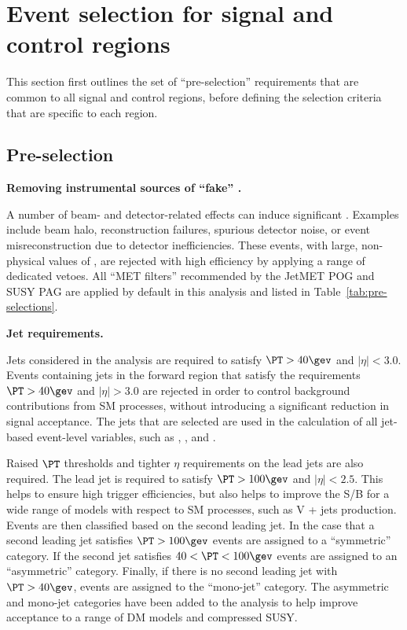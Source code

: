 \section{Event selection for signal and control regions}
\label{sec:selection}

This section first outlines the set of ``pre-selection'' requirements
that are common to all signal and control regions, before defining the
selection criteria that are specific to each region.

\subsection{Pre-selection}
\label{sec:preSelection}

{\bf Removing instrumental sources of ``fake'' \met.} 

A number of beam- and detector-related effects can induce significant
\met. Examples include beam halo, reconstruction failures, spurious
detector noise, or event misreconstruction due to detector
inefficiencies. These events, with large, non-physical values of \met,
are rejected with high efficiency by applying a range of dedicated
vetoes. All ``MET filters'' recommended by the JetMET POG and SUSY PAG
are applied by default in this analysis and listed in Table~\ref{tab:pre-selections}.

{\bf Jet requirements.} 

Jets considered in the analysis are required to satisfy $\PT>40\gev$
and $|\eta|<3.0$. Events containing jets in the forward region that
satisfy the requirements $\PT>40\gev$ and $|\eta|>3.0$ are rejected in
order to control background contributions from SM processes, without
introducing a significant reduction in signal acceptance. The jets
that are selected are used in the calculation of all jet-based
event-level variables, such as \HT, \mht, and \alphat.

Raised $\PT$ thresholds and tighter $\eta$ requirements on the lead jets 
are also required. The lead jet is required to satisfy $\PT > 100\gev$
and $|\eta|<2.5$. This helps to ensure high trigger efficiencies,
but also helps to improve the S/B for a wide
range of models with respect to SM processes, such as V + jets
production. Events are then classified based on the
second leading jet. In the case that a second leading jet satisfies $\PT > 100\gev$ 
events are assigned to a ``symmetric'' \njet category. If the second
jet satisfies $40 < \PT < 100\gev$ events are assigned to an
``asymmetric'' \njet category. Finally, if there is no second leading
jet with $\PT>40\gev$, events are assigned to the ``mono-jet''
category. The asymmetric and mono-jet categories have been added to
the analysis to help improve acceptance to a range of DM models and compressed
SUSY.


